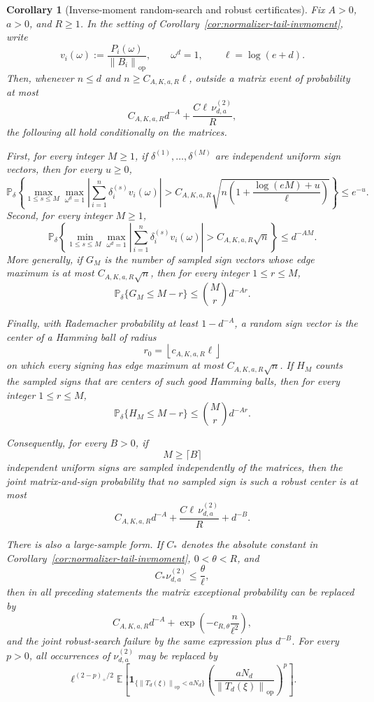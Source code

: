 \documentclass[11pt]{amsart}
\numberwithin{equation}{section}
\newtheorem{corollary}[theorem]{Corollary}
\theoremstyle{definition}
\theoremstyle{remark}
\newcommand{\op}{\mathrm{op}}
\newcommand{\Prob}{\mathbb P}
\newcommand{\Exp}{\mathbb E}
\newcommand{\norm}[1]{\left\lVert #1\right\rVert}
\begin{document}
\begin{corollary}[Inverse-moment random-search and robust certificates]
\label{cor:normalizer-tail-invmoment-search}
Fix \(A>0\), \(a>0\), and \(R\ge1\).  In the setting of
Corollary~\ref{cor:normalizer-tail-invmoment}, write
\[
  v_i(\omega):=\frac{P_i(\omega)}{\norm{B_i}_{\op}},
  \qquad \omega^d=1,
  \qquad \ell=\log(e+d).
\]
Then, whenever \(n\le d\) and \(n\ge C_{A,K,a,R}\ell\), outside a matrix event
of probability at most
\[
  C_{A,K,a,R}d^{-A}+\frac{C\ell\,\nu_{d,a}^{(2)}}{R},
\]
the following all hold conditionally on the matrices.

First, for every integer \(M\ge1\), if
\(\delta^{(1)},\ldots,\delta^{(M)}\) are independent uniform sign vectors, then
for every \(u\ge0\),
\[
  \Prob_\delta\left\{
  \max_{1\le s\le M}\max_{\omega^d=1}
  \left|\sum_{i=1}^n\delta_i^{(s)}v_i(\omega)\right|
  >
  C_{A,K,a,R}\sqrt{
    n\left(1+\frac{\log(eM)+u}{\ell}\right)}
  \right\}\le e^{-u}.
\]
Second, for every integer \(M\ge1\),
\[
  \Prob_\delta\left\{
  \min_{1\le s\le M}\max_{\omega^d=1}
  \left|\sum_{i=1}^n\delta_i^{(s)}v_i(\omega)\right|
  > C_{A,K,a,R}\sqrt n
  \right\}\le d^{-AM}.
\]
More generally, if \(G_M\) is the number of sampled sign vectors whose edge
maximum is at most \(C_{A,K,a,R}\sqrt n\), then for every integer
\(1\le r\le M\),
\[
  \Prob_\delta\{G_M\le M-r\}\le \binom Mr d^{-Ar}.
\]

Finally, with Rademacher probability at least \(1-d^{-A}\), a random sign
vector is the center of a Hamming ball of radius
\[
  r_0=\left\lfloor c_{A,K,a,R}\ell\right\rfloor
\]
on which every signing has edge maximum at most \(C_{A,K,a,R}\sqrt n\).  If
\(H_M\) counts the sampled signs that are centers of such good Hamming balls,
then for every integer \(1\le r\le M\),
\[
  \Prob_\delta\{H_M\le M-r\}\le \binom Mr d^{-Ar}.
\]

Consequently, for every \(B>0\), if
\[
  M\ge\lceil B\rceil
\]
independent uniform signs are sampled independently of the matrices, then the
joint matrix-and-sign probability that no sampled sign is such a robust center
is at most
\[
  C_{A,K,a,R}d^{-A}+\frac{C\ell\,\nu_{d,a}^{(2)}}{R}+d^{-B}.
\]

There is also a large-sample form.  If \(C_*\) denotes the absolute constant in
Corollary~\ref{cor:normalizer-tail-invmoment}, \(0<\theta<R\), and
\[
  C_*\nu_{d,a}^{(2)}\le\frac{\theta}{\ell},
\]
then in all preceding statements the matrix exceptional probability can be
replaced by
\[
  C_{A,K,a,R}d^{-A}
  +\exp\left(-c_{R,\theta}\frac n{\ell^2}\right),
\]
and the joint robust-search failure by the same expression plus \(d^{-B}\).
For every \(p>0\), all occurrences of \(\nu_{d,a}^{(2)}\) may be replaced by
\[
  \ell^{(2-p)_+/2}
  \Exp\left[
  \mathbf 1_{\{\norm{T_d(\xi)}_{\op}<aN_d\}}
  \left(\frac{aN_d}{\norm{T_d(\xi)}_{\op}}\right)^p
  \right].
\]
\end{corollary}
\end{document}
